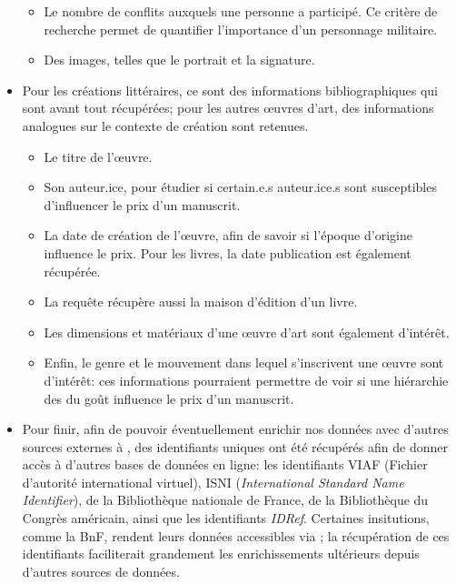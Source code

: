 \begin{itemize}
\begin{itemize}
		\item Le nombre de conflits auxquels une personne a participé. Ce critère de recherche permet de quantifier l'importance d'un personnage militaire.
		\item Des images, telles que le portrait et la signature.
	\end{itemize}
	\item Pour les créations littéraires, ce sont des informations bibliographiques qui sont avant tout récupérées; pour les autres œuvres d'art, des informations analogues sur le contexte de création sont retenues.
	\begin{itemize}
		\item Le titre de l'œuvre.
		\item Son auteur.ice, pour étudier si certain.e.s auteur.ice.s sont susceptibles d'influencer le prix d'un manuscrit.
		\item La date de création de l'œuvre, afin de savoir si l'époque d'origine influence le prix. Pour les livres, la date publication est également récupérée.
		\item La requête récupère aussi la maison d'édition d'un livre.
		\item Les dimensions et matériaux d'une œuvre d'art sont également d'intérêt.
		\item Enfin, le genre et le mouvement dans lequel s'inscrivent une œuvre sont d'intérêt: ces informations pourraient permettre de voir si une hiérarchie des du goût influence le prix d'un manuscrit.
	\end{itemize}
	\item Pour finir, afin de pouvoir éventuellement enrichir nos données avec d'autres sources externes à \wkd{}, des identifiants uniques ont été récupérés afin de donner accès à d'autres bases de données en ligne: les identifiants VIAF (Fichier d'autorité international virtuel), ISNI (\textit{International Standard Name Identifier}), de la Bibliothèque nationale de France, de la Bibliothèque du Congrès américain, ainsi que les identifiants \textit{IDRef}. Certaines insitutions, comme la BnF, rendent leurs données accessibles via \sparql{}; la récupération de ces identifiants faciliterait grandement les enrichissements ultérieurs depuis d'autres sources de données.
\end{itemize}

